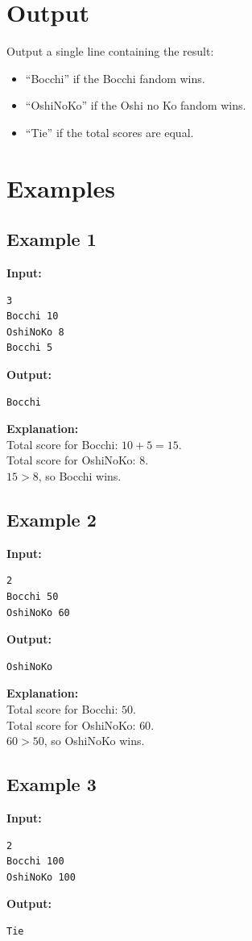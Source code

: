 \documentclass[11pt]{article}
\begin{document}
\section*{Output}

Output a single line containing the result:
\begin{itemize}
    \item ``Bocchi'' if the Bocchi fandom wins.
    \item ``OshiNoKo'' if the Oshi no Ko fandom wins.
    \item ``Tie'' if the total scores are equal.
\end{itemize}

\section*{Examples}

\subsection*{Example 1}
\textbf{Input:}
\begin{verbatim}
3
Bocchi 10
OshiNoKo 8
Bocchi 5
\end{verbatim}

\textbf{Output:}
\begin{verbatim}
Bocchi
\end{verbatim}

\textbf{Explanation:} \\
Total score for Bocchi: $10 + 5 = 15$. \\
Total score for OshiNoKo: $8$. \\
$15 > 8$, so Bocchi wins.

\subsection*{Example 2}
\textbf{Input:}
\begin{verbatim}
2
Bocchi 50
OshiNoKo 60
\end{verbatim}

\textbf{Output:}
\begin{verbatim}
OshiNoKo
\end{verbatim}

\textbf{Explanation:} \\
Total score for Bocchi: $50$. \\
Total score for OshiNoKo: $60$. \\
$60 > 50$, so OshiNoKo wins.

\subsection*{Example 3}
\textbf{Input:}
\begin{verbatim}
2
Bocchi 100
OshiNoKo 100
\end{verbatim}

\textbf{Output:}
\begin{verbatim}
Tie
\end{verbatim}
\end{document}
